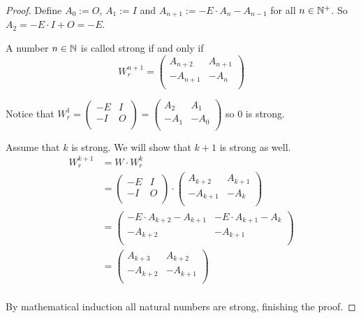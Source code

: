 \begin{proof}
  Define $A_{0} := O$, $A_{1} := I$ and
  $A_{n+1} := -E \cdot A_{n} - A_{n-1}$ for all $n\in\mathbb{N}^{+}$. So
  $A_{2} = -E \cdot I + O = -E$.

  A number $n\in\mathbb{N}$ is called strong if and only if
  \[
  W_{r}^{n+1}
  =
  \left(
  \begin{array}{cc}
     A_{n+2} &  A_{n+1} \\
    -A_{n+1} & -A_{n}   \\
  \end{array}
  \right)
  \]

  Notice that
  $W_{r}^{1} = \left(\begin{smallmatrix} -E & I \\ -I & O \\\end{smallmatrix}\right) = \left(\begin{smallmatrix} A_{2} & A_{1} \\ -A_{1} & -A_{0} \\\end{smallmatrix}\right)$
  so $0$ is strong.

  Assume that $k$ is strong. We will show that $k+1$ is strong as well.
  \[
  \begin{aligned}
  W_{r}^{k+1}
  & = W \cdot W_{r}^{k} \\
  & =
  \left(
  \begin{array}{cc}
    -E & I \\
    -I & O \\
  \end{array}
  \right)
  \cdot
  \left(
  \begin{array}{cc}
     A_{k+2} &  A_{k+1} \\
    -A_{k+1} & -A_{k}   \\
  \end{array}
  \right) \\
  & =
  \left(
  \begin{array}{cc}
    -E \cdot A_{k+2} - A_{k+1} & -E \cdot A_{k+1} - A_{k} \\
    -A_{k+2}                  & -A_{k+1}                 \\
  \end{array}
  \right) \\
  & =
  \left(
  \begin{array}{cc}
     A_{k+3} &  A_{k+2} \\
    -A_{k+2} & -A_{k+1} \\
  \end{array}
  \right) \\
  \end{aligned}
  \]

  By mathematical induction all natural
  numbers are strong, finishing the proof.
\end{proof}

